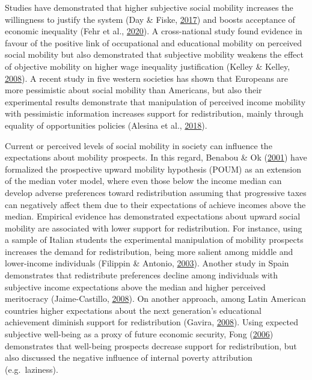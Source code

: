 \documentclass[
  12pt,
]{book}
\begin{document}
Studies have demonstrated that higher subjective social mobility increases the willingness to justify the system (Day \& Fiske, \protect\hyperlink{ref-Day2017}{2017}) and boosts acceptance of economic inequality (Fehr et al., \protect\hyperlink{ref-fehr_social_2020}{2020}). A cross-national study found evidence in favour of the positive link of occupational and educational mobility on perceived social mobility but also demonstrated that subjective mobility weakens the effect of objective mobility on higher wage inequality justification (Kelley \& Kelley, \protect\hyperlink{ref-kelley_subjective_2008}{2008}). A recent study in five western societies has shown that Europeans are more pessimistic about social mobility than Americans, but also their experimental results demonstrate that manipulation of perceived income mobility with pessimistic information increases support for redistribution, mainly through equality of opportunities policies (Alesina et al., \protect\hyperlink{ref-alesina_intergenerational_2018}{2018}).

Current or perceived levels of social mobility in society can influence the expectations about mobility prospects. In this regard, Benabou \& Ok (\protect\hyperlink{ref-benabou_social_2001}{2001}) have formalized the prospective upward mobility hypothesis (POUM) as an extension of the median voter model, where even those below the income median can develop adverse preferences toward redistribution assuming that progressive taxes can negatively affect them due to their expectations of achieve incomes above the median. Empirical evidence has demonstrated expectations about upward social mobility are associated with lower support for redistribution. For instance, using a sample of Italian students the experimental manipulation of mobility prospects increases the demand for redistribution, being more salient among middle and lower-income individuals (Filippin \& Antonio, \protect\hyperlink{ref-Filippin2003}{2003}). Another study in Spain demonstrates that redistribute preferences decline among individuals with subjective income expectations above the median and higher perceived meritocracy (Jaime-Castillo, \protect\hyperlink{ref-Jaime-Castillo2008}{2008}). On another approach, among Latin American countries higher expectations about the next generation's educational achievement diminish support for redistribution (Gavira, \protect\hyperlink{ref-gavira_social_2008}{2008}). Using expected subjective well-being as a proxy of future economic security, Fong (\protect\hyperlink{ref-fong_prospective_2006}{2006}) demonstrates that well-being prospects decrease support for redistribution, but also discussed the negative influence of internal poverty attribution (e.g.~laziness).
\end{document}
